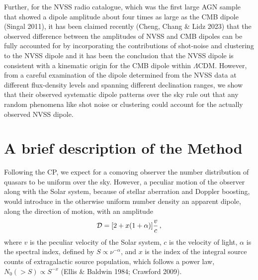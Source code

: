 \documentclass[fleqn,usenatbib]{mnras}
\begin{document}
Further, for the NVSS radio catalogue, which was the first large AGN sample that  showed a dipole amplitude about four times as large as the CMB dipole (Singal 2011), it has been claimed recently (Cheng, Chang \& Lidz 2023) that the observed difference between the amplitudes of NVSS and CMB dipoles can be fully accounted for by incorporating the contributions of shot-noise and clustering to the NVSS dipole and it has been the conclusion that the NVSS dipole is consistent with a kinematic origin for the CMB dipole within $\Lambda$CDM. 
However, from a careful examination of the dipole determined from the NVSS data at different flux-density levels and spanning different declination ranges, we show that their observed systematic dipole  patterns over the sky rule out that any random phenomena like shot noise or clustering could account for the actually observed NVSS dipole.
\section{A brief description of the Method}
Following the CP, we expect for a comoving observer the number distribution of quasars to be uniform over the sky.
However, a peculiar motion of the observer along with the Solar system, because of stellar aberration and Doppler boosting, would introduce in the otherwise uniform number density an apparent dipole, along the direction of motion, with an amplitude  
\begin{equation}
\label{eq:7}
{\cal D}=[2+ x (1+\alpha)]\frac {v}{c}\,,
\end{equation}
where $v$ is the peculiar velocity of the  Solar system, $c$ is the velocity of light, $\alpha$ is the spectral index, defined by $S \propto \nu^{-\alpha}$, and $x$ is the index of the integral source counts of extragalactic source population, which follows a power law, $N_0(>S)\propto S^{-x}$ (Ellis \& Baldwin 1984; Crawford 2009). 
\end{document}
